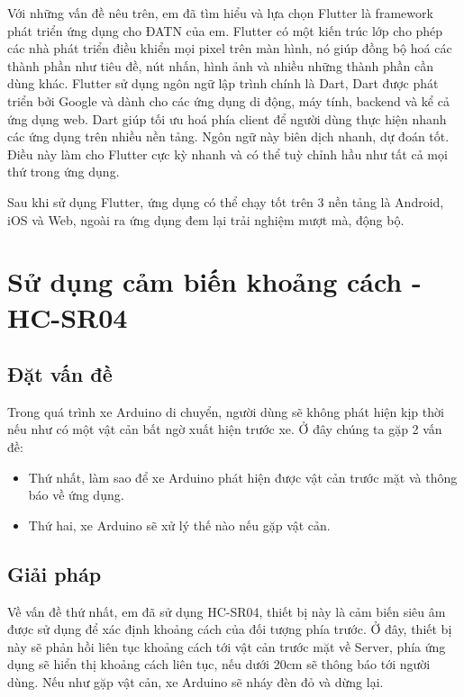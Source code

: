 \documentclass[../DoAn.tex]{subfiles}
\begin{document}
Với những vấn đề nêu trên, em đã tìm hiểu và lựa chọn Flutter là framework phát triển ứng dụng cho ĐATN của em. Flutter có một kiến trúc lớp cho phép các nhà phát triển điều khiển mọi pixel trên màn hình, nó giúp đồng bộ hoá các thành phần như tiêu đề, nút nhấn, hình ảnh và nhiều những thành phần cần dùng khác. Flutter sử dụng ngôn ngữ lập trình chính là Dart, Dart được phát triển bởi Google và dành cho các ứng dụng di động, máy tính, backend và kể cả ứng dụng web. Dart giúp tối ưu hoá phía client để người dùng thực hiện nhanh các ứng dụng trên nhiều nền tảng. Ngôn ngữ này biên dịch nhanh, dự đoán tốt. Điều này làm cho Flutter cực kỳ nhanh và có thể tuỳ chỉnh hầu như tất cả mọi thứ trong ứng dụng.

Sau khi sử dụng Flutter, ứng dụng có thể chạy tốt trên 3 nền tảng là Android, iOS và Web, ngoài ra ứng dụng đem lại trải nghiệm mượt mà, động bộ.

\section{Sử dụng cảm biến khoảng cách - HC-SR04}
\subsection{Đặt vấn đề}

Trong quá trình xe Arduino di chuyển, người dùng sẽ không phát hiện kịp thời nếu như có một vật cản bất ngờ xuất hiện trước xe. Ở đây chúng ta gặp 2 vấn đề:

\begin{itemize}
    \item Thứ nhất, làm sao để xe Arduino phát hiện được vật cản trước mặt và thông báo về ứng dụng.
    \item Thứ hai, xe Arduino sẽ xử lý thế nào nếu gặp vật cản.
\end{itemize}

\subsection{Giải pháp}

Về vấn đề thứ nhất, em đã sử dụng HC-SR04, thiết bị này là cảm biến siêu âm được sử dụng để xác định khoảng cách của đối tượng phía trước. Ở đây, thiết bị này sẽ phản hồi liên tục khoảng cách tới vật cản trước mặt về Server, phía ứng dụng sẽ hiển thị khoảng cách liên tục, nếu dưới 20cm sẽ thông báo tới người dùng. Nếu như gặp vật cản, xe Arduino sẽ nháy đèn đỏ và dừng lại.
\end{document}
